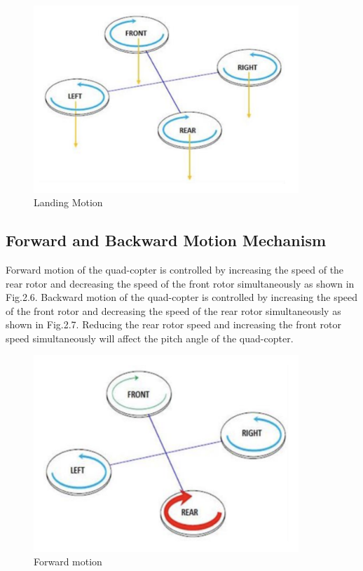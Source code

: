 \begin{figure}[h!]
\centering
\includegraphics[width=10cm]{./Figures/landing_motion_qc.png}
\caption{Landing Motion}
\label{Landing_Motion}
\end{figure}

\subsection{Forward and Backward Motion Mechanism}
\par Forward motion of the quad-copter is controlled by increasing the speed of the rear rotor and decreasing the speed of the front rotor simultaneously as shown in Fig.2.6. Backward motion of the quad-copter is controlled by increasing the speed of the front rotor and decreasing the speed of the rear rotor simultaneously as shown in Fig.2.7. Reducing the rear rotor speed and increasing the front rotor speed simultaneously will affect the pitch angle of the quad-copter.

\begin{figure}[h!]
\centering
\includegraphics[width=10cm]{./Figures/forward_motion_qc.png}
\caption{Forward motion}
\label{Forward_motion}
\end{figure}

